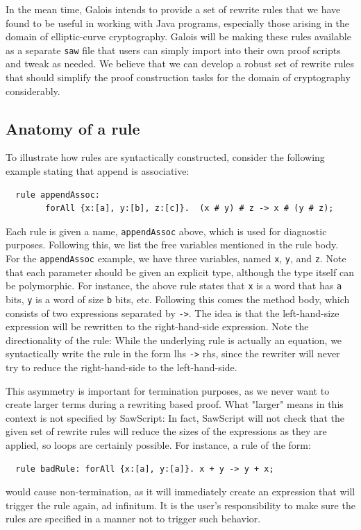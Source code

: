 \documentclass[12pt]{galois-whitepaper}
\newcommand{\sawScript}{{\sc SawScript}\xspace}
\begin{document}
In the mean time, Galois intends to provide a set of rewrite rules that we have found to be useful in working with Java programs, especially those arising
in the domain of elliptic-curve cryptography. Galois will be making these rules available as a separate {\tt saw} file that users can simply import into their
own proof scripts and tweak as
needed. We believe that we can develop a robust set of rewrite rules that should simplify the proof construction tasks for the domain of cryptography
considerably.

\subsection{Anatomy of a rule}\label{sec:ruleanatomy}
To illustrate how rules are syntactically constructed, consider the following example stating that
append is associative:
\begin{Verbatim}
  rule appendAssoc:
        forAll {x:[a], y:[b], z:[c]}.  (x # y) # z -> x # (y # z);
\end{Verbatim}
Each rule is given a name, {\tt appendAssoc} above, which is used for diagnostic purposes. Following this, we list the
free variables mentioned in the rule body. For the {\tt appendAssoc} example, we have three variables, named {\tt x},
{\tt y}, and {\tt z}. Note that each parameter should be given an explicit type, although the type itself can be polymorphic.
For instance, the above rule states that {\tt x} is a word that has {\tt a} bits, {\tt y} is a word of size {\tt b} bits, etc.
Following this comes the method body, which consists of two expressions separated by {\tt ->}. The idea is that the left-hand-size
expression will be rewritten to the right-hand-side expression.
Note the directionality of the rule: While the underlying rule is actually an equation,
we syntactically write the rule in the form lhs {\tt ->} rhs, since the rewriter will never try to reduce the right-hand-side to
the left-hand-side.

This asymmetry is important for termination purposes, as we never want to create larger terms during a rewriting based proof. What "larger"
means in this context is not specified by \sawScript: In fact, \sawScript will not check that the given set of
rewrite rules will reduce the sizes of the
expressions as they are applied, so loops are certainly possible. For instance, a rule of the form:
\begin{Verbatim}
  rule badRule: forAll {x:[a], y:[a]}. x + y -> y + x;
\end{Verbatim}
would cause non-termination, as it will immediately create an expression that will trigger the rule again, ad infinitum. It is the
user's responsibility to make sure the rules are specified in a manner not to trigger such behavior.
\end{document}
